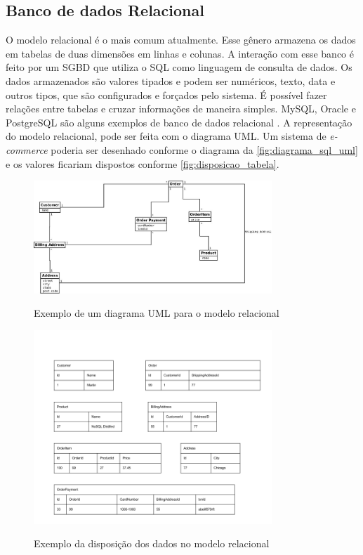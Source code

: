 \subsection{Banco de dados Relacional}
\label{subsec:relationaldatabasetype}
O modelo relacional é o mais comum atualmente. Esse gênero armazena os dados em tabelas de duas dimensões em linhas e colunas. A interação com esse banco é feito por um \ac{SGBD} que utiliza o \ac{SQL} como linguagem de consulta de dados. Os dados armazenados são valores tipados e podem ser numéricos, texto, data e outros tipos, que são configurados e forçados pelo sistema. É possível fazer relações entre tabelas e cruzar informações de maneira simples. MySQL, Oracle e PostgreSQL são alguns exemplos de banco de dados relacional \cite{SDSW}.
A representação do modelo relacional, pode ser feita com o diagrama \ac{UML}. Um sistema de \textit{e-commerce} poderia ser desenhado conforme o diagrama da \autoref{fig:diagrama_sql_uml} e os valores ficariam dispostos conforme \autoref{fig:disposicao_tabela}.
\begin{figure}[!htb]
    \centering
    \caption{Exemplo de um diagrama \ac{UML} para o modelo relacional}
    \includegraphics[width=0.8\textwidth]{./04-figuras/diagrama_sql_uml.jpg}
    \label{fig:diagrama_sql_uml}
\end{figure}
\begin{figure}[!htb]
    \centering
    \caption{Exemplo da disposição dos dados no modelo relacional}
    \includegraphics[width=0.8\textwidth]{./04-figuras/disposicao_dados_tabela.png}
    \label{fig:disposicao_tabela}
\end{figure}


